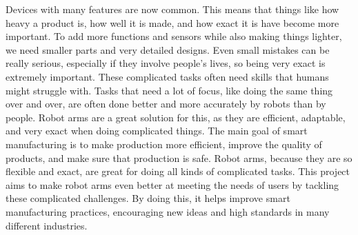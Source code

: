Devices with many features are now common. This means that things like how heavy a product is, how well it is made, and how exact it is have become more important. To add more functions and sensors while also making things lighter, we need smaller parts and very detailed designs. Even small mistakes can be really serious, especially if they involve people's lives, so being very exact is extremely important. These complicated tasks often need skills that humans might struggle with. Tasks that need a lot of focus, like doing the same thing over and over, are often done better and more accurately by robots than by people. Robot arms are a great solution for this, as they are efficient, adaptable, and very exact when doing complicated things. The main goal of smart manufacturing is to make production more efficient, improve the quality of products, and make sure that production is safe. Robot arms, because they are so flexible and exact, are great for doing all kinds of complicated tasks. This project aims to make robot arms even better at meeting the needs of users by tackling these complicated challenges. By doing this, it helps improve smart manufacturing practices, encouraging new ideas and high standards in many different industries.
